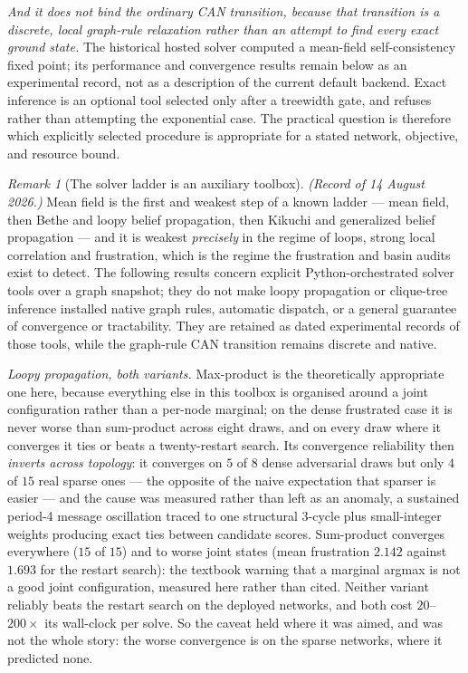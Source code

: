 \documentclass[11pt,a4paper]{article}
\theoremstyle{remark}
\newtheorem{remark}[definition]{Remark}
\begin{document}
\emph{And it does not bind the ordinary CAN transition, because that transition is a discrete,
local graph-rule relaxation rather than an attempt to find every exact ground state.} The historical
hosted solver computed a mean-field self-consistency fixed point; its performance and convergence
results remain below as an experimental record, not as a description of the current default backend.
Exact inference is an optional tool selected only after a treewidth gate, and refuses rather than
attempting the exponential case. The practical question is therefore which explicitly selected
procedure is appropriate for a stated network, objective, and resource bound.

\begin{remark}[The solver ladder is an auxiliary toolbox]\label{rem:hierarchy}
\emph{(Record of 14 August 2026.)} Mean field is the first and weakest step of a known ladder --- mean
field, then Bethe and loopy belief propagation, then Kikuchi and generalized belief propagation
\citep{yedidia2005} --- and it is weakest \emph{precisely} in the regime of loops, strong local
correlation and frustration, which is the regime the frustration and basin audits exist to detect.
The following results concern explicit Python-orchestrated solver tools over a graph snapshot; they do
not make loopy propagation or clique-tree inference installed native graph rules, automatic dispatch,
or a general guarantee of convergence or tractability. They are retained as dated experimental records
of those tools, while the graph-rule CAN transition remains discrete and native.

\emph{Loopy propagation, both variants.} Max-product is the theoretically appropriate one here,
because everything else in this toolbox is organised around a joint configuration rather than a
per-node marginal; on the dense frustrated case it is never worse than sum-product across eight draws,
and on every draw where it converges it ties or beats a twenty-restart search. Its convergence
reliability then \emph{inverts across topology}: it converges on $5$ of $8$ dense adversarial draws but
only $4$ of $15$ real sparse ones --- the opposite of the naive expectation that sparser is easier ---
and the cause was measured rather than left as an anomaly, a sustained period-4 message oscillation
traced to one structural 3-cycle plus small-integer weights producing exact ties between candidate
scores. Sum-product converges everywhere ($15$ of $15$) and to worse joint states (mean frustration
$2.142$ against $1.693$ for the restart search): the textbook warning that a marginal argmax is not a
good joint configuration, measured here rather than cited. Neither variant reliably beats the restart
search on the deployed networks, and both cost $20$--$200\times$ its wall-clock per solve. So the
caveat held where it was aimed, and was not the whole story: the worse convergence is on the sparse
networks, where it predicted none.


\end{remark}
\end{document}
